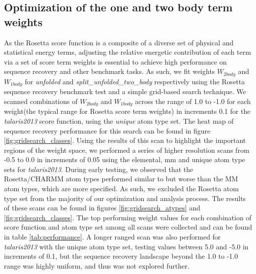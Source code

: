 \subsection{Optimization of the one and two body term weights}
As the Rosetta score function is a composite of a diverse set of physical and statistical energy terms, adjusting the relative energetic contribution of each term via a set of score term weights is essential to achieve high performance on sequence recovery and other benchmark tasks\cite{rohl_protein_2004,leaver-fay_chapter_2013}.
As such, we fit weights $W_{2body}$ and $W_{1body}$ for \textit{unfolded} and \textit{split\_unfolded\_two\_body} respectively using the Rosetta sequence recovery benchmark test\cite{leaver-fay_chapter_2013} and a simple grid-based search technique.
We scanned combinations of $W_{2body}$ and $W_{1body}$ across the range of 1.0 to -1.0 for each weight(the typical range for Rosetta score term weights) in increments 0.1 for the \textit{talaris2013} score function, using the \textit{unique} atom type set.
The heat map of sequence recovery performance for this search can be found in figure \ref{fig:gridsearch_classes}.
Using the results of this scan to highlight the important regions of the weight space, we performed a series of higher resolution scans from -0.5 to 0.0 in increments of 0.05 using the elemental, mm and unique atom type sets for \textit{talaris2013}.
During early testing, we observed that the Rosetta/CHARMM atom types performed similar to but worse than the MM atom types, which are more specified.
As such, we excluded the Rosetta atom type set from the majority of our optimization and analysis process.
The results of these scans can be found in figures \ref{fig:gridsearch_atypes} and \ref{fig:gridsearch_classes}.
The top performing weight values for each combination of score function and atom type set among all scans were collected and can be found in table \ref{tab:performance}.
A longer ranged scan was also performed for \textit{talaris2013} with the unique atom type set, testing values between 5.0 and -5.0 in increments of 0.1, but the sequence recovery landscape beyond the 1.0 to -1.0 range was highly uniform, and thus was not explored further.

